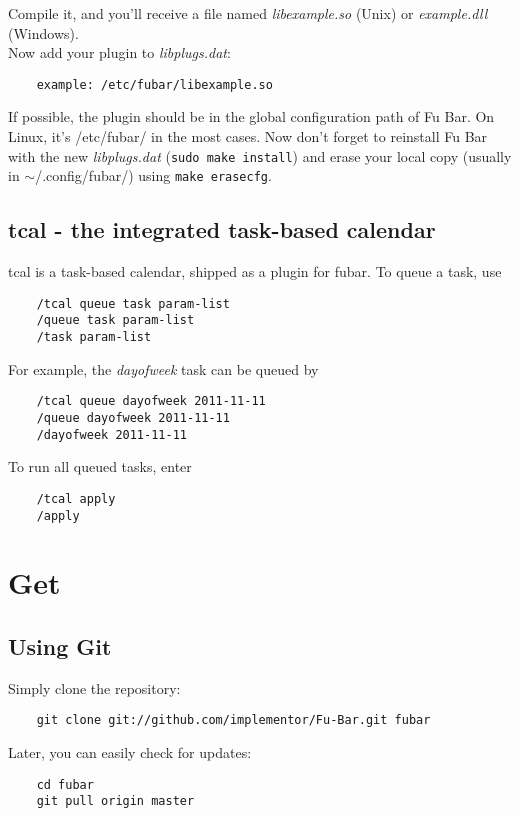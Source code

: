 \documentclass[12pt,a4paper]{article}
\begin{document}
	Compile it, and you'll receive a file named \textit{libexample.so} (Unix) 
	or \textit{example.dll} (Windows).\\
	Now add your plugin to \textit{libplugs.dat}:
	\begin{verbatim}
	example: /etc/fubar/libexample.so
	\end{verbatim}
	If possible, the plugin should be in the global configuration path of Fu 
	Bar. On Linux, it's /etc/fubar/ in the most cases. Now don't forget to
	reinstall Fu Bar with the new \textit{libplugs.dat} (\texttt{sudo make 
	install}) and erase your local copy (usually in $\sim$/.config/fubar/)
	using \texttt{make erasecfg}.
	
	\subsection{tcal - the integrated task-based calendar}
	
	tcal is a task-based calendar, shipped as a plugin for fubar.
	To queue a task, use
	\begin{verbatim}
	/tcal queue task param-list
	/queue task param-list
	/task param-list
	\end{verbatim}
	
	For example, the \textit{dayofweek} task can be queued by
	\begin{verbatim}
	/tcal queue dayofweek 2011-11-11
	/queue dayofweek 2011-11-11
	/dayofweek 2011-11-11
	\end{verbatim}
	
	To run all queued tasks, enter
	\begin{verbatim}
	/tcal apply
	/apply
	\end{verbatim}
	
	\section{Get}
	
	\subsection{Using Git}
	
	Simply clone the repository:
	\begin{verbatim}
	git clone git://github.com/implementor/Fu-Bar.git fubar
	\end{verbatim}
	Later, you can easily check for updates:
	\begin{verbatim}
	cd fubar
	git pull origin master
	\end{verbatim}
	
\end{document}
